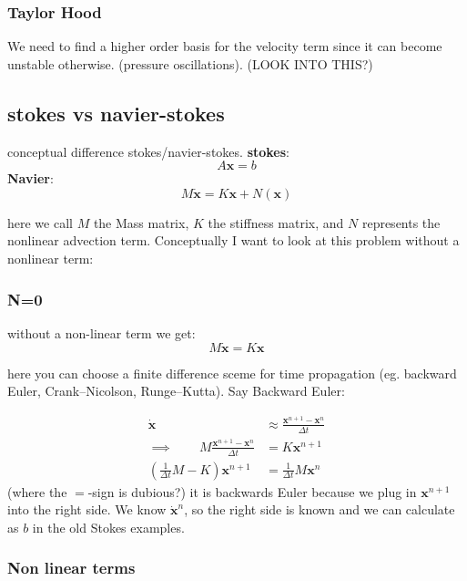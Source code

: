 \documentclass{article}
\begin{document}
\subsubsection*{Taylor Hood}
We need to find a higher order basis for the velocity term since it can become unstable otherwise. (pressure oscillations). (LOOK INTO THIS?)

\subsection*{stokes vs navier-stokes}
conceptual difference stokes/navier-stokes.
\textbf{stokes}:
\begin{equation}
    A\mathbf{x}=b
\end{equation}
\textbf{Navier}:
\begin{equation}
    M\mathbf{\dot{x}}=K\mathbf{x}+N(\mathbf{x})
\end{equation}

here we call $M$ the Mass matrix, $K$ the stiffness matrix, and $N$ represents the nonlinear advection term. Conceptually I want to look at this problem without a nonlinear term:

\subsubsection*{N=0}

without a non-linear term we get:
\begin{equation*}
    M\mathbf{\dot x}=K\mathbf{x}
\end{equation*}

here you can choose a finite difference sceme for time propagation (eg. backward Euler, Crank–Nicolson, Runge–Kutta). Say Backward Euler:

\begin{align*}
    \mathbf{\dot x}&\approx \frac{\mathbf{x}^{n+1}-\mathbf{x}^n}{\Delta t} \\
    \implies \qquad M\frac{\mathbf{x}^{n+1}-\mathbf{x}^n}{\Delta t}&= K\mathbf{x}^{n+1}\\
    \left( \frac{1}{\Delta t}M - K\right) \mathbf{x}^{n+1}&= \frac{1}{\Delta t}M\mathbf{x}^n
\end{align*}
(where the $=$-sign is dubious?) it is backwards Euler because we plug in $\mathbf{x}^{n+1}$ into the right side. We know $\mathbf{\dot x}^n$, so the right side is known and we can calculate as $b$ in the old Stokes examples.

\subsubsection*{Non linear terms}
\end{document}
